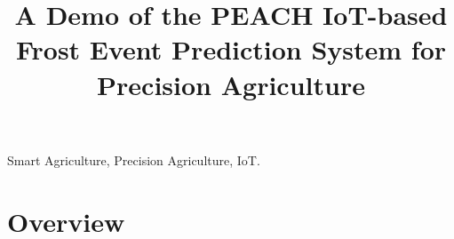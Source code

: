 \documentclass[conference]{IEEEtran}
\newcommand{\name}                {PEACH\xspace}
\begin{document}
\title{A Demo of the \name IoT-based Frost Event Prediction System for Precision Agriculture}

\author{
}

\maketitle

\begin{abstract}
\end{abstract}

\begin{IEEEkeywords}
Smart Agriculture, Precision Agriculture, IoT.
\end{IEEEkeywords}

\IEEEpeerreviewmaketitle

\section{Overview}
\label{sec:overview}

\end{document}
